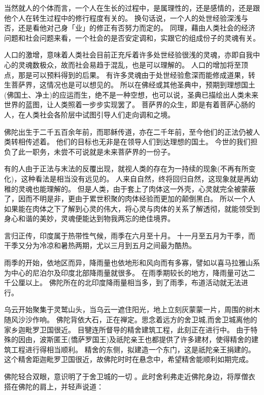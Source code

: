 \documentclass[twoside,openany]{book}
\begin{document}
当然就人的个体而言，一个人在生长的过程中，是属理性的，还是感情的，还是跟他个人在转生过程中的修行程度有关的。
换句话说，一个人的处世经验深浅与否，还是看他对己身「业」的修正有否努力而定的。
同理，藉由人类社会的经济问题和社会问题来看，一个社会的是否安定调和，实跟它的组成份子的灵魂有关。

人口的激增，意味着人类社会目前正充斥着许多处世经验很浅的灵魂，亦即自我中心的灵魂数极众，故而社会易趋于混乱，也是可以理解的。
%
%
人口的增加将至顶点，那是可以预料得到的后果。
有许多灵魂由于处世经验愈深而能修成道果，转生菩萨界，这情况也是可以想见的。
所以在佛经或其他圣典中，预期到理想国土(佛国土、净土)的应运而生，绝不是一种空想，也可以说，圣典已描绘出人类未来世界的蓝图，让人类照着一步步实现罢了。
菩萨界的众生，即是有着菩萨心肠的人，在人类社会各阶层中试图引导人们走向调和之境。

佛陀出生于二千五百余年前，而耶稣传道，亦在二千年前，至今他们的正法仍被人类转相传述着。
他们的目标也无非是在领导人们到达理想的国土。
今世的我们担负了此一职务，未尝不可说就是未来菩萨界的一份子。

有的人由于正法与末法的反覆出现，就视人类的存在为一持续的现象(不再有所变化)，这种看法是相当没有远见的。
人来自自然，终将回归自然，这现象就是再幼稚的灵魂也能理解的。
但是人类，由于套上了肉体这一外壳，心灵就完全被蒙蔽了，因而不明是非，更由于累世积聚的肉体经验而更加的颠倒黑白。
所以一个人如果能在肉体之下了解到心灵的伟大，将心灵与肉体的关系了解透彻，就能领受到身心和谐的美妙，灵魂便能达到物我两忘的绝佳境界。

言归正传，印度属于热带性气候，雨季在六月至十月。
十一月至五月为干季，而干季又分为冷凉和暑热两期，尤以三月到五月之间最为酷热。

雨季的开始，依地区而异，降雨量也依地形和风向而有多寡，譬如以喜马拉雅山系为中心的尼泊尔及印度北部降雨量就很多。
在雨季期较长的地方，降雨量可达二千公厘以上。
佛陀所在的北印度降雨量相当多，到了雨季，布道活动就无法进行。

乌云开始聚集于灵鹫山头，当乌云一遮住阳光，地上立刻灰蒙蒙一片，周围的树木随风沙沙作响。
佛陀背依大石，正在禅定。思念着远方的舍卫城,而舍卫城离他的家乡迦毗罗卫国很近。
目犍连所督导的精舍建筑工程，此刻正在进行中。
%
%
由于特殊的因由，波斯匿王(憍萨罗国王)及祇陀亲王也都提供了许多建材，使得精舍的建筑工程进行得相当顺利。
精舍的东侧，拟建造一个东门，这是祇陀亲王捐建的。这个精舍距迦毗罗卫国很近，故佛陀时时在悬念中，希望精舍能顺利如期完成。

佛陀轻合双眼，意识明了于舍卫城的一切
。此时舍利弗走近佛陀身边，将厚僧衣搭在佛陀的肩上，并轻声说道：
\end{document}
